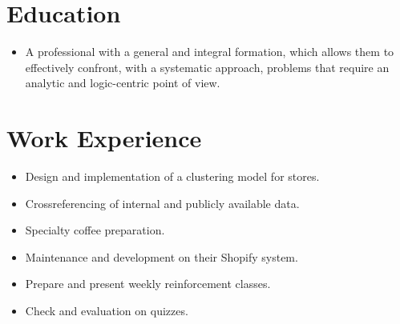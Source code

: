 \documentclass{my_cv}
\begin{document}
\makecvtitle

\vspace*{-1cm}

\section{Education \faBook} 
\begin{itemize}
\item A professional with a general and integral formation, which allows them to effectively confront, with a systematic approach, problems that require an analytic and logic-centric point of view. 
\end{itemize}

\section{Work Experience \faSuitcase}
\begin{itemize}
\item Design and implementation of a clustering model for stores.
\item Crossreferencing of internal and publicly available data.
\end{itemize}
\begin{itemize}
\item Specialty coffee preparation.
\item Maintenance and development on their Shopify system.
\end{itemize}
\begin{itemize}
\item Prepare and present weekly reinforcement classes.
\item Check and evaluation on quizzes.
\end{itemize}
\end{document}
